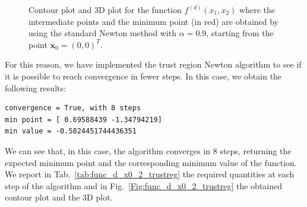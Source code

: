 \documentclass[a4paper,11pt]{article}
\begin{document}
	\begin{figure}[H]
		\centering
		 \quad
		\caption{Contour plot and 3D plot for the function $f^{(d)}(x_{1},x_{2})$ where the intermediate points and the minimum point (in red) are obtained by using the standard Newton method with $\alpha=0.9$, starting from the point $\textbf{x}_{0}=(0,0)^{T}$.}
		\label{Fig:func_d}
	\end{figure}

\noindent For this reason, we have implemented the trust region Newton algorithm to see if it is possible to reach convergence in fewer steps. In this case, we obtain the following results:
\begin{verbatim}
convergence = True, with 8 steps
min point = [ 0.69588439 -1.34794219]
min value = -0.5824451744436351
\end{verbatim}
We can see that, in this case, the algorithm converges in $8$ steps, returning the expected minimum point and the corresponding minimum value of the function. We report in Tab.~\ref{tab:func_d_x0_2_trustreg} the required quantities at each step of the algorithm and in Fig.~\ref{Fig:func_d_x0_2_trustreg} the obtained contour plot and the 3D plot.
\end{document}
